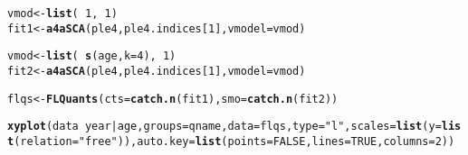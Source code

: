 \documentclass[a4paper,english,10pt]{article}\usepackage[]{graphicx}\usepackage[]{color}
\makeatletter
\newcommand{\hlnum}[1]{\textcolor[rgb]{0.686,0.059,0.569}{#1}}%
\newcommand{\hlstr}[1]{\textcolor[rgb]{0.192,0.494,0.8}{#1}}%
\newcommand{\hlopt}[1]{\textcolor[rgb]{0,0,0}{#1}}%
\newcommand{\hlstd}[1]{\textcolor[rgb]{0.345,0.345,0.345}{#1}}%
\newcommand{\hlkwb}[1]{\textcolor[rgb]{0.69,0.353,0.396}{#1}}%
\newcommand{\hlkwc}[1]{\textcolor[rgb]{0.333,0.667,0.333}{#1}}%
\newcommand{\hlkwd}[1]{\textcolor[rgb]{0.737,0.353,0.396}{\textbf{#1}}}%
\newenvironment{kframe}{%
 \def\at@end@of@kframe{}%
 \ifinner\ifhmode%
  \def\at@end@of@kframe{\end{minipage}}%
  \begin{minipage}{\columnwidth}%
 \fi\fi%
 \def\FrameCommand##1{\hskip\@totalleftmargin \hskip-\fboxsep
 \colorbox{shadecolor}{##1}\hskip-\fboxsep
     \hskip-\linewidth \hskip-\@totalleftmargin \hskip\columnwidth}%
 \MakeFramed {\advance\hsize-\width
   \@totalleftmargin\z@ \linewidth\hsize
   \@setminipage}}%
 {\par\unskip\endMakeFramed%
 \at@end@of@kframe}
\newenvironment{knitrout}{}{} %
\makeatother
\begin{document}
\begin{knitrout}
\color{fgcolor}\begin{kframe}
\begin{alltt}
\hlstd{vmod} \hlkwb{<-} \hlkwd{list}\hlstd{(}\hlopt{~}\hlnum{1}\hlstd{,} \hlopt{~}\hlnum{1}\hlstd{)}
\hlstd{fit1} \hlkwb{<-} \hlkwd{a4aSCA}\hlstd{(ple4, ple4.indices[}\hlnum{1}\hlstd{],} \hlkwc{vmodel}\hlstd{=vmod)}
\end{alltt}


{\ttfamily\noindent\bfseries{}}\begin{alltt}
\hlstd{vmod} \hlkwb{<-} \hlkwd{list}\hlstd{(}\hlopt{~} \hlkwd{s}\hlstd{(age,} \hlkwc{k}\hlstd{=}\hlnum{4}\hlstd{),} \hlopt{~}\hlnum{1}\hlstd{)}
\hlstd{fit2} \hlkwb{<-} \hlkwd{a4aSCA}\hlstd{(ple4, ple4.indices[}\hlnum{1}\hlstd{],} \hlkwc{vmodel}\hlstd{=vmod)}
\end{alltt}


{\ttfamily\noindent\bfseries{}}\begin{alltt}
\hlstd{flqs} \hlkwb{<-} \hlkwd{FLQuants}\hlstd{(}\hlkwc{cts}\hlstd{=}\hlkwd{catch.n}\hlstd{(fit1),} \hlkwc{smo}\hlstd{=}\hlkwd{catch.n}\hlstd{(fit2))}
\end{alltt}


{\ttfamily\noindent\bfseries{}}\end{kframe}
\end{knitrout}

\begin{knitrout}
\color{fgcolor}\begin{kframe}
\begin{alltt}
\hlkwd{xyplot}\hlstd{(data}\hlopt{~}\hlstd{year}\hlopt{|}\hlstd{age,} \hlkwc{groups}\hlstd{=qname,} \hlkwc{data}\hlstd{=flqs,} \hlkwc{type}\hlstd{=}\hlstr{"l"}\hlstd{,} \hlkwc{scales}\hlstd{=}\hlkwd{list}\hlstd{(}\hlkwc{y}\hlstd{=}\hlkwd{list}\hlstd{(}\hlkwc{relation}\hlstd{=}\hlstr{"free"}\hlstd{)),} \hlkwc{auto.key}\hlstd{=}\hlkwd{list}\hlstd{(}\hlkwc{points}\hlstd{=}\hlnum{FALSE}\hlstd{,} \hlkwc{lines}\hlstd{=}\hlnum{TRUE}\hlstd{,} \hlkwc{columns}\hlstd{=}\hlnum{2}\hlstd{))}
\end{alltt}


{\ttfamily\noindent\bfseries{}}\end{kframe}
\end{knitrout}
\end{document}
